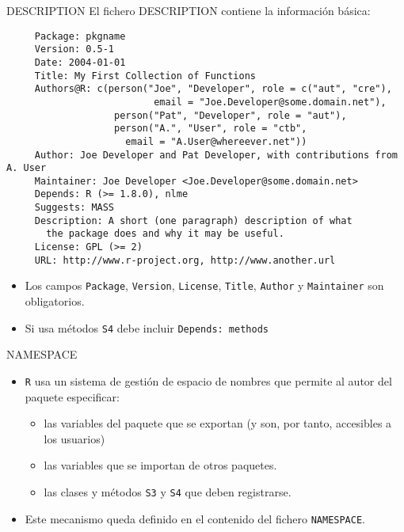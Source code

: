 \documentclass[xcolor={usenames,svgnames,dvipsnames}]{beamer}
\begin{document}
\begin{frame}[label={sec:org7765188},fragile]{DESCRIPTION}
 El fichero DESCRIPTION contiene la información básica:
\begin{verbatim}
     Package: pkgname
     Version: 0.5-1
     Date: 2004-01-01
     Title: My First Collection of Functions
     Authors@R: c(person("Joe", "Developer", role = c("aut", "cre"),
                          email = "Joe.Developer@some.domain.net"),
                   person("Pat", "Developer", role = "aut"),
                   person("A.", "User", role = "ctb",
     	             email = "A.User@whereever.net"))
     Author: Joe Developer and Pat Developer, with contributions from A. User
     Maintainer: Joe Developer <Joe.Developer@some.domain.net>
     Depends: R (>= 1.8.0), nlme
     Suggests: MASS
     Description: A short (one paragraph) description of what
       the package does and why it may be useful.
     License: GPL (>= 2)
     URL: http://www.r-project.org, http://www.another.url
\end{verbatim}
\begin{itemize}
\item Los campos \texttt{Package}, \texttt{Version}, \texttt{License}, \texttt{Title}, \texttt{Author} y
\texttt{Maintainer} son obligatorios.
\item Si usa métodos \texttt{S4} debe incluir \texttt{Depends: methods}
\end{itemize}
\end{frame}
\begin{frame}[label={sec:org88e24cd},fragile]{NAMESPACE}
 \begin{itemize}
\item \texttt{R} usa un sistema de gestión de \alert{espacio de nombres} que
permite al autor del paquete especificar:
\begin{itemize}
\item las \alert{variables} del paquete que se \alert{exportan} (y son, por tanto,
accesibles a los usuarios)
\item las \alert{variables} que se \alert{importan} de otros paquetes.
\item las \alert{clases y métodos} \texttt{S3} y \texttt{S4} que deben registrarse.
\end{itemize}
\item Este mecanismo queda definido en el contenido del fichero
\texttt{NAMESPACE}.
\end{itemize}
\end{frame}
\end{document}
